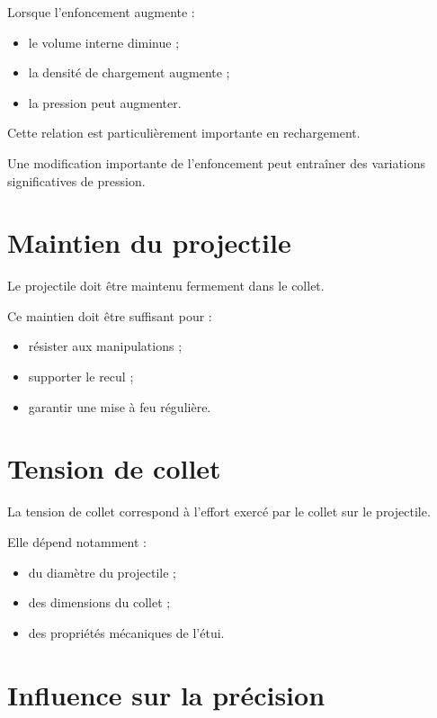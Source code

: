 Lorsque l'enfoncement augmente :

\begin{itemize}
    \item le volume interne diminue ;
    \item la densité de chargement augmente ;
    \item la pression peut augmenter.
\end{itemize}

Cette relation est particulièrement importante en rechargement.

\begin{attention}

Une modification importante de l'enfoncement peut entraîner des variations
significatives de pression.

\end{attention}

\section{Maintien du projectile}

Le projectile doit être maintenu fermement dans le collet.

Ce maintien doit être suffisant pour :

\begin{itemize}
    \item résister aux manipulations ;
    \item supporter le recul ;
    \item garantir une mise à feu régulière.
\end{itemize}

\section{Tension de collet}

La tension de collet correspond à l'effort exercé par le collet sur le
projectile.

Elle dépend notamment :

\begin{itemize}
    \item du diamètre du projectile ;
    \item des dimensions du collet ;
    \item des propriétés mécaniques de l'étui.
\end{itemize}

\section{Influence sur la précision}

